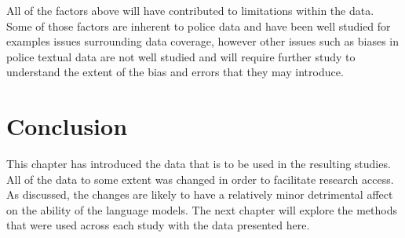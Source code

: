 All of the factors above will have contributed to limitations within the data. Some of those factors are inherent to police data and have been well studied for examples issues surrounding data coverage, however other issues such as biases in police textual data are not well studied and will require further study to understand the extent of the bias and errors that they may introduce.

\section{Conclusion} This chapter has introduced the data that is to be used in the resulting studies. All  of the data to some extent was changed in order to facilitate research access. As discussed, the changes are likely to have a relatively minor detrimental affect on the ability of the language models. The next chapter will explore the methods that were used across each study with the data presented here.






